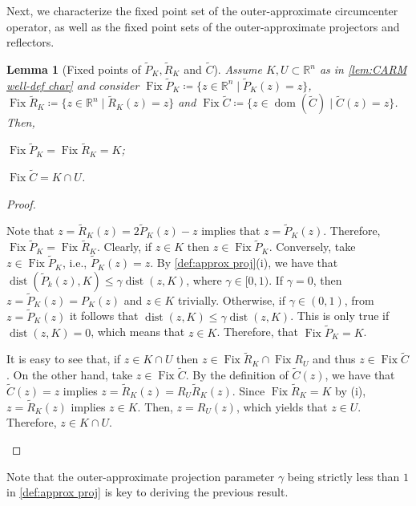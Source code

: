 \documentclass[smallextended,numbook,nospthms]{svjour3}
\theoremstyle{plain}
\newtheorem{lemma}[theorem]{Lemma}
\theoremstyle{definition}
\def\RR{\mathds R}
\DeclareMathOperator{\Fix}{Fix}
\begin{document}
Next, we characterize the fixed point set of the outer-approximate circumcenter operator, as well as the fixed point sets of the outer-approximate projectors and reflectors.
\begin{lemma}[Fixed points of $\tilde{P}_{K}, \tilde{R}_{K}$ and $\tilde{C}$]\label{lem:CARM fix} 
	Assume $K, U \subset \RR^{n}$ as in  \cref{lem:CARM well-def char} and consider $\Fix \tilde{P}_{K}\coloneqq \{z \in \RR^{n} \mid \tilde{P}_{K}(z)=z\}$, $\Fix \tilde{R}_{K}\coloneqq \{z \in \RR^{n} \mid \tilde{R}_{K}(z)=z\}$ and $\Fix \tilde{C}\coloneqq \{z \in \operatorname{dom}(\tilde{C}) \mid \tilde{C}(z)=z\}$. Then,
	\begin{listi}
	\item $\Fix \tilde{P}_{K}=\Fix \tilde{R}_{K}=K$; 
	\item $\Fix \tilde{C}=K \cap U$.
	\end{listi}
\end{lemma}
	\begin{proof}
	\begin{listi}
	\item Note that $z=\tilde{R}_{K}(z) = 2\tilde{P}_{K}(z)-z$ implies that $z=\tilde{P}_{K}(z)$. Therefore, $\Fix \tilde{P}_{K}=\Fix \tilde{R}_{K}$. 
	Clearly, if $z \in K$ then $z \in\Fix \tilde{P}_{K}$. Conversely, take $z \in \Fix \tilde{P}_{K}$, i.e., $\tilde{P}_{K}(z)=z$.
    By \cref{def:approx proj}(i), we have that $\operatorname{dist}(\tilde{P}_{k}(z), K) \leq \gamma \operatorname{dist}(z, K)$, where $\gamma \in [0,1)$. If $\gamma=0$, then $z=\tilde{P}_{K}(z)=P_{K}(z)$ and $z \in K$ trivially. Otherwise, if $\gamma \in (0,1)$, from $z = \tilde{P}_{K}(z)$ it follows that $\operatorname{dist}(z, K) \leq \gamma \operatorname{dist}(z, K)$. This is only true if $\operatorname{dist}(z, K)=0$, which means that $z \in K$. Therefore, that $\Fix \tilde{P}_{K}=K$.
	\item It is easy to see that, if $z \in K \cap U$ then $z \in \Fix \tilde{R}_{K} \cap \Fix R_{U}$ and thus $z \in \Fix \tilde{C}$. On the other hand, take $z \in \Fix \tilde{C}$. By the definition of $\tilde{C}(z)$, we have that $\tilde{C}(z)=z$ implies $z=\tilde{R}_{K}(z)=R_{U}\tilde{R}_{K}(z)$. Since $\Fix \tilde{R}_{K}=K$ by (i), $z=\tilde{R}_{K}(z)$ implies $z \in K$. Then, $z=R_{U}(z)$, which yields that $z \in U$. Therefore, $z \in K \cap U$.
	\end{listi}
\end{proof}

Note that the outer-approximate projection parameter $\gamma$ being strictly less than $1$ in \cref{def:approx proj} is key to deriving the previous result.
\end{document}
